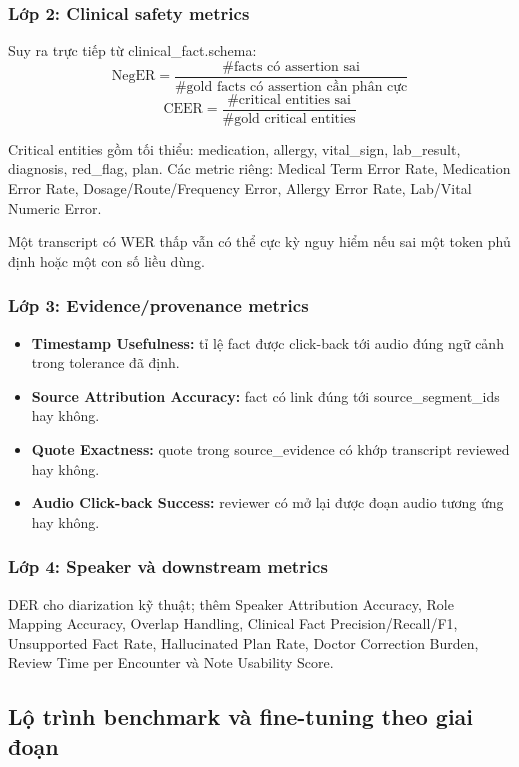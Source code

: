 \subsubsection{Lớp 2: Clinical safety metrics}

Suy ra trực tiếp từ clinical\_fact.schema:
\[
\text{NegER} = \frac{\#\text{facts có assertion sai}}{\#\text{gold facts có assertion cần phân cực}}
\]
\[
\text{CEER} = \frac{\#\text{critical entities sai}}{\#\text{gold critical entities}}
\]

Critical entities gồm tối thiểu: medication, allergy, vital\_sign, lab\_result, diagnosis, red\_flag, plan. Các metric riêng: Medical Term Error Rate, Medication Error Rate, Dosage/Route/Frequency Error, Allergy Error Rate, Lab/Vital Numeric Error.

Một transcript có WER thấp vẫn có thể cực kỳ nguy hiểm nếu sai một token phủ định hoặc một con số liều dùng.

\subsubsection{Lớp 3: Evidence/provenance metrics}

\begin{itemize}
    \item \textbf{Timestamp Usefulness:} tỉ lệ fact được click-back tới audio đúng ngữ cảnh trong tolerance đã định.
    \item \textbf{Source Attribution Accuracy:} fact có link đúng tới source\_segment\_ids hay không.
    \item \textbf{Quote Exactness:} quote trong source\_evidence có khớp transcript reviewed hay không.
    \item \textbf{Audio Click-back Success:} reviewer có mở lại được đoạn audio tương ứng hay không.
\end{itemize}

\subsubsection{Lớp 4: Speaker và downstream metrics}

DER cho diarization kỹ thuật; thêm Speaker Attribution Accuracy, Role Mapping Accuracy, Overlap Handling, Clinical Fact Precision/Recall/F1, Unsupported Fact Rate, Hallucinated Plan Rate, Doctor Correction Burden, Review Time per Encounter và Note Usability Score.

\subsection{Lộ trình benchmark và fine-tuning theo giai đoạn}

